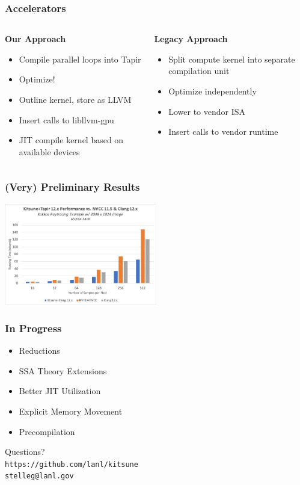 \documentclass[usenames,dvipsnames]{beamer}
\begin{document}
\begin{frame}[fragile]
\frametitle{Accelerators}
\begin{columns}
\begin{column}{0.5\textwidth}
\center\textbf{Our Approach}

\begin{itemize}
\item Compile parallel loops into Tapir
\item Optimize!
\item Outline kernel, store as LLVM
\item Insert calls to libllvm-gpu
\item JIT compile kernel based on available devices
\end{itemize}
\end{column}
\begin{column}{0.5\textwidth}

\center
\textbf{Legacy Approach}
\vspace{1cm}
\begin{itemize}
\item Split compute kernel into separate compilation unit
\item Optimize independently
\item Lower to vendor ISA
\item Insert calls to vendor runtime 
\end{itemize}
\end{column}
\end{columns}
\end{frame}

\begin{frame}[fragile]
\frametitle{(Very) Preliminary Results}
\hspace{0.25\textwidth} \includegraphics[width=0.5\textwidth]{results.jpg}
\end{frame}

\begin{frame}[fragile]
\frametitle{In Progress}
\begin{itemize}
\item Reductions
\item SSA Theory Extensions
\item Better JIT Utilization
\item Explicit Memory Movement
\item Precompilation
\end{itemize}
\end{frame}

\begin{frame}
\center
\huge{Questions?}\\
\vspace{2cm}
\small
\texttt{https://github.com/lanl/kitsune}\\
\texttt{stelleg@lanl.gov} 
\end{frame}
\end{document}
